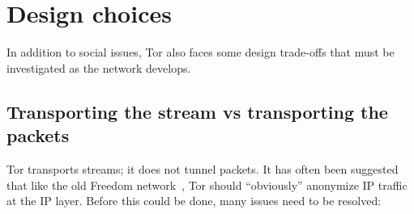 \documentclass{llncs}
\begin{document}

\section{Design choices}

In addition to social issues, Tor also faces some design trade-offs that must
be investigated as the network develops.

\subsection{Transporting the stream vs transporting the packets}
\label{subsec:stream-vs-packet}
\label{subsec:tcp-vs-ip}

Tor transports streams; it does not tunnel packets.
It has often been suggested that like the old Freedom
network~\cite{freedom21-security}, Tor should
``obviously'' anonymize IP traffic
at the IP layer. Before this could be done, many issues need to be resolved:
\end{document}
